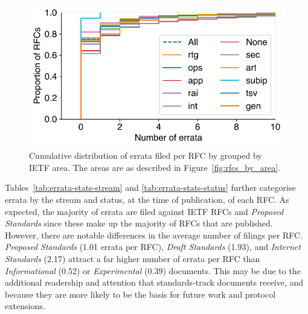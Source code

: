 \documentclass[twocolumn,10pt]{article}
\newlength{\figureWidthOneColumn}
\newcommand{\todo}[1]{\textbf{\textcolor{red}{To do: #1}}}
\begin{document}
\begin{figure}
  \centering
  \includegraphics[width=\figureWidthOneColumn]{figures-prev/tma-2023/errata-by-rfc-by-area.pdf}
  \caption{
    Cumulative distribution of errata filed per RFC by grouped by IETF
    area.  The areas are as described in Figure~\ref{fig:rfcs_by_area}.
  }
  \label{fig:errata_per_rfc}
\end{figure}

Tables~\ref{tab:errata-stats-stream} and \ref{tab:errata-stats-status}
further categorise errata by the stream and status, at the time of
publication, of each RFC. As expected, the majority of errata are filed
against IETF RFCs and \emph{Proposed Standards} since these make up the
majority of RFCs that are published. However, there are notable differences
in the average number of filings per RFC. \emph{Proposed Standards} (1.01
errata per RFC), \emph{Draft Standards} (1.93), and \emph{Internet
Standards} (2.17) attract a far higher number of errata per RFC than
\emph{Informational} (0.52) or \emph{Experimental} (0.39) documents. This
may be due to the additional readership and attention that standards-track
documents receive, and because they are more likely to be the basis for
future work and protocol extensions.




\end{document}
